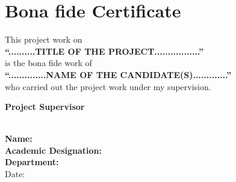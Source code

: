 \chapter*{Bona fide Certificate}
\begin{center}

\vspace{1cm}

This project work on\\[0.3cm]
\textbf{``..........TITLE OF THE PROJECT.................''}\\[0.6cm]
is the bona fide work of\\[0.3cm]
\textbf{``..............NAME OF THE CANDIDATE(S).............''}\\[0.6cm]
who carried out the project work under my supervision.

\vspace{3cm}

\end{center}


\noindent
\textbf{Project Supervisor}

\vspace{1.5cm}

\noindent
\makebox[6cm]{\hrulefill}\\
\textbf{Name: }\\
\textbf{Academic Designation: }\\
\textbf{Department: }\\[0.8cm]

\noindent
Date:\ \underline{\hspace{4cm}}
